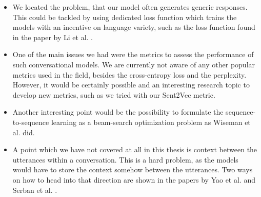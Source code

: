 \begin{itemize}
  \item We located the problem, that our model often generates generic responses. This could be tackled by using dedicated loss function which trains the models with an incentive on language variety, such as the loss function found in the paper by Li et al. \cite{Li:2016}.

  \item One of the main issues we had were the metrics to assess the performance of such conversational models. We are currently not aware of any other popular metrics used in the field, besides the cross-entropy loss and the perplexity. However, it would be certainly possible and an interesting research topic to develop new metrics, such as we tried with our Sent2Vec metric.

  \item Another interesting point would be the possibility to formulate the sequence-to-sequence learning as a beam-search optimization problem as Wiseman et al. \cite{Wiseman:2016} did.

  \item A point which we have not covered at all in this thesis is context between the utterances within a conversation. This is a hard problem, as the models would have to store the context somehow between the utterances. Two ways on how to head into that direction are shown in the papers by Yao et al. \cite{Yao:2015} and Serban et al. \cite{Serban:2015}.
\end{itemize}
